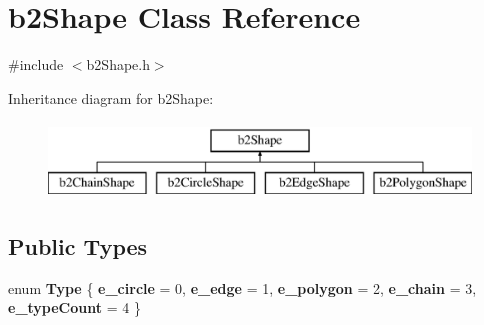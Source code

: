\hypertarget{classb2_shape}{}\section{b2\+Shape Class Reference}
\label{classb2_shape}


{\ttfamily \#include $<$b2\+Shape.\+h$>$}

Inheritance diagram for b2\+Shape\+:\begin{figure}[H]
\begin{center}
\leavevmode
\includegraphics[height=2.000000cm]{classb2_shape}
\end{center}
\end{figure}
\subsection*{Public Types}
\begin{DoxyCompactItemize}
\item 
\mbox{\label{classb2_shape_a4c1f3a9ad6b3150bb90ad9018ca4b1e0}} 
enum {\bfseries Type} \{ \newline
{\bfseries e\+\_\+circle} = 0, 
{\bfseries e\+\_\+edge} = 1, 
{\bfseries e\+\_\+polygon} = 2, 
{\bfseries e\+\_\+chain} = 3, 
\newline
{\bfseries e\+\_\+type\+Count} = 4
 \}
\end{DoxyCompactItemize}
